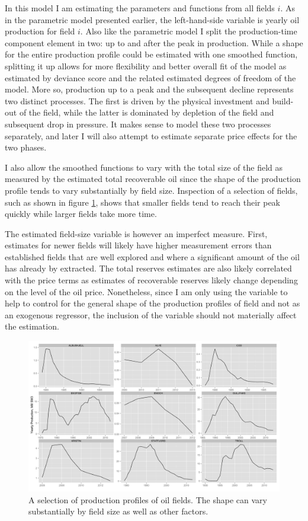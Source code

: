 \documentclass[12pt]{article}
\begin{document}
In this model I am estimating the parameters and functions from all fields $i$. As in the parametric model presented earlier, the left-hand-side variable is yearly oil production for field $i$. Also like the parametric model I split the production-time component element in two: up to and after the peak in production. While a shape for the entire production profile could be estimated with one smoothed function, splitting it up allows for more flexibility and better overall fit of the model as estimated by deviance score and the related estimated degrees of freedom of the model.  More so, production up to a peak and the subsequent decline represents two distinct processes.  The first is driven by the physical investment and build-out of the field, while the latter is dominated by depletion of the field and subsequent drop in pressure. It makes sense to model these two processes separately, and later I will also attempt to estimate separate price effects for the two phases. 

I also allow the smoothed functions to vary with the total size of the field as measured by the estimated total recoverable oil since the shape of the production profile tends to vary substantially by field size.  Inspection of a selection of fields, such as shown in figure \ref{field_inspection}, shows that smaller fields tend to reach their peak quickly while larger fields take more time. 

The estimated field-size variable is however an imperfect measure.  First, estimates for newer fields will likely have higher measurement errors than established fields that are well explored and where a significant amount of the oil has already by extracted.  The total reserves estimates are also likely correlated with the price terms as estimates of recoverable reserves likely change depending on the level of the oil price.  Nonetheless, since I am only using the variable to help to control for the general shape of the production profiles of field and not as an exogenous regressor, the inclusion of the variable should not materially affect the estimation.

\begin{figure}
	\includegraphics[width=1\textwidth]{figures/field_inspection_print.png}
	\caption{A selection of production profiles of oil fields.  The shape can vary substantially by field size as well as other factors.}
	\label{field_inspection}
\end{figure}
\end{document}
